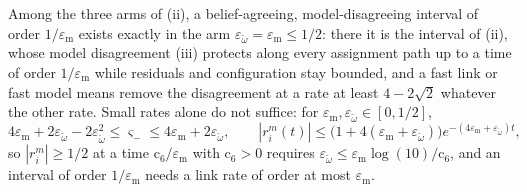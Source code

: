 Among the three arms of (ii), a belief-agreeing, model-disagreeing interval of
order $1/\varepsilon_{\mathrm m}$ exists exactly in the arm
$\varepsilon_{\check\omega}=\varepsilon_{\mathrm m}\le1/2$: there it is the interval
of (ii), whose model disagreement (iii) protects along every assignment path up to a
time of order $1/\varepsilon_{\mathrm m}$ while residuals and configuration stay
bounded, and a fast link or fast model means remove the disagreement at a rate at
least $4-2\sqrt2$ whatever the other rate. Small rates alone do not suffice: for
$\varepsilon_{\mathrm m},\varepsilon_{\check\omega}\in[0,1/2]$,
\begin{equation}
4\varepsilon_{\mathrm m}+2\varepsilon_{\check\omega}-2\varepsilon_{\check\omega}^2
\le\varsigma_-\le4\varepsilon_{\mathrm m}+2\varepsilon_{\check\omega},
\qquad
|r^m_i(t)|\le\bigl(1+4(\varepsilon_{\mathrm m}+\varepsilon_{\check\omega})\bigr)
e^{-(4\varepsilon_{\mathrm m}+\varepsilon_{\check\omega})t},
\label{eq:obs-cycle-general-slow-rate}
\end{equation}
so $|r^m_i|\ge1/2$ at a time $\mathrm c_6/\varepsilon_{\mathrm m}$ with
$\mathrm c_6>0$ requires
$\varepsilon_{\check\omega}\le\varepsilon_{\mathrm m}\log(10)/\mathrm c_6$, and an
interval of order $1/\varepsilon_{\mathrm m}$ needs a link rate of order at most
$\varepsilon_{\mathrm m}$. 

